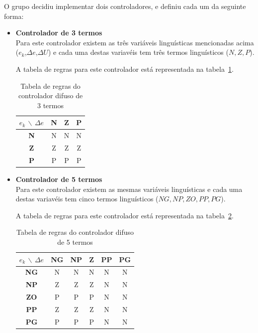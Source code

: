 \documentclass{article}
\begin{document}
O grupo decidiu implementar dois controladores, e definiu cada um da seguinte forma:
\begin{itemize}
\item \textbf{Controlador de 3 termos} \\
Para este controlador existem as três variáveis linguísticas mencionadas acima ($e_{k}$,$\Delta e$,$\Delta U$) e cada uma destas variavéis tem três termos linguísticos (${N,Z,P}$).

A tabela de regras para este controlador está representada na tabela~\ref{3_terms_fuzzy}.

\begin{table}[!h]
\centering
	\caption{Tabela de regras do controlador difuso de 3 termos}
	\label{3_terms_fuzzy}
	\begin{tabular}{|c|c|c|c|}
	\hline 
	$e_{k}$ $\backslash$ $\Delta e$ & \textbf{N} & \textbf{Z} & \textbf{P} \\ 
	\hline 
	\textbf{N} & N  & N & N \\ 
	\hline 
	\textbf{Z} & Z & Z & Z \\ 
	\hline 
	\textbf{P} & P & P & P \\ 
	\hline 
	\end{tabular} 
\end{table}


\item \textbf{Controlador de 5 termos} \\
Para este controlador existem as mesmas variáveis linguísticas e cada uma destas variavéis tem cinco termos linguísticos (${NG,NP,ZO,PP,PG}$).

A tabela de regras para este controlador está representada na tabela~\ref{5_terms_fuzzy}.

\begin{table}[!h]
\centering
	\caption{Tabela de regras do controlador difuso de 5 termos}
	\label{5_terms_fuzzy}
	\begin{tabular}{|c|c|c|c|c|c|}
	\hline 
	$e_{k}$ $\backslash$ $\Delta e$ & \textbf{NG} & \textbf{NP} & \textbf{Z} & \textbf{PP} & \textbf{PG} \\ 
	\hline 
	\textbf{NG} & N  & N & N & N & N\\ 
	\hline 
	\textbf{NP} & Z & Z & Z & N & N\\ 
	\hline 
	\textbf{ZO} & P & P & P & N & N\\ 
	\hline
	\textbf{PP} & Z & Z & Z & N & N\\ 
	\hline 
	\textbf{PG} & P & P & P & N & N\\ 
	\hline 
	\end{tabular} 
\end{table}
\end{itemize}
\end{document}
